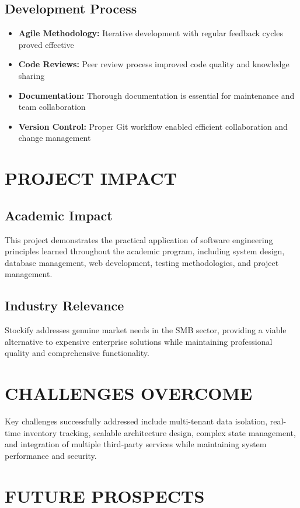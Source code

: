 \subsection{Development Process}
\begin{itemize}
\item \textbf{Agile Methodology:} Iterative development with regular feedback cycles proved effective
\item \textbf{Code Reviews:} Peer review process improved code quality and knowledge sharing
\item \textbf{Documentation:} Thorough documentation is essential for maintenance and team collaboration
\item \textbf{Version Control:} Proper Git workflow enabled efficient collaboration and change management
\end{itemize}

\section{PROJECT IMPACT}

\subsection{Academic Impact}
This project demonstrates the practical application of software engineering principles learned throughout the academic program, including system design, database management, web development, testing methodologies, and project management.

\subsection{Industry Relevance}
Stockify addresses genuine market needs in the SMB sector, providing a viable alternative to expensive enterprise solutions while maintaining professional quality and comprehensive functionality.

\section{CHALLENGES OVERCOME}

Key challenges successfully addressed include multi-tenant data isolation, real-time inventory tracking, scalable architecture design, complex state management, and integration of multiple third-party services while maintaining system performance and security.

\section{FUTURE PROSPECTS}

